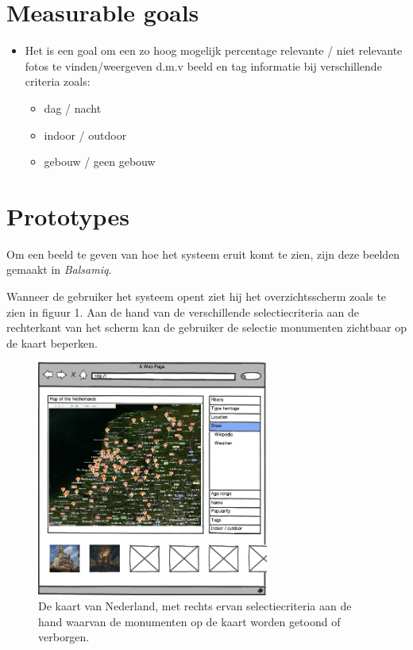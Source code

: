 \documentclass{article}
\begin{document}
\section{Measurable goals}
\begin{itemize}
\item Het is een goal om een zo hoog mogelijk percentage relevante / niet relevante fotos te vinden/weergeven d.m.v beeld en tag informatie bij verschillende criteria zoals:
\begin{itemize}
\item dag / nacht
\item indoor / outdoor
\item gebouw / geen gebouw
\end{itemize}

\end{itemize}
\section{Prototypes}
Om een beeld te geven van hoe het systeem eruit komt te zien, zijn deze beelden gemaakt in \emph{Balsamiq}. 

Wanneer de gebruiker het systeem opent ziet hij het overzichtsscherm zoals te zien in figuur 1. Aan de hand van de verschillende selectiecriteria aan de rechterkant van het scherm kan de gebruiker de selectie monumenten zichtbaar op de kaart beperken.
\begin{figure}[htp]
  \centering
  \includegraphics[width=3in]{user-story-overview.png}
  \caption[Het overzichtsscherm]%
  {De kaart van Nederland, met rechts ervan selectiecriteria aan de hand waarvan de monumenten op de kaart worden getoond of verborgen.}
\end{figure}
\end{document}
